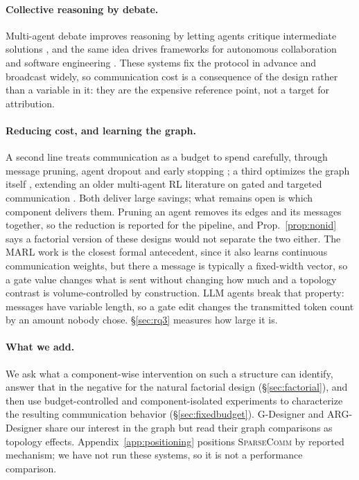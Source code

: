 \documentclass[11pt]{article}
\newcommand{\sys}{\textsc{SparseComm}\xspace}
\begin{document}
\paragraph{Collective reasoning by debate.}
Multi-agent debate improves reasoning by letting agents critique intermediate
solutions
\citep{du2024improving,liang-etal-2024-encouraging,chan2023chatevalbetterllmbasedevaluators},
and the same idea drives frameworks for autonomous collaboration and software
engineering
\citep{wu2024autogen,li2023camel,hong2024metagpt,qian-etal-2024-chatdev,chen2023agentverse,gao2024agentscopeflexiblerobustmultiagent}.
These systems fix the protocol in advance and broadcast widely, so communication
cost is a consequence of the design rather than a variable in it: they are the
expensive reference point, not a target for attribution.

\paragraph{Reducing cost, and learning the graph.}
A second line treats communication as a budget to spend carefully, through
message pruning, agent dropout and early stopping
\citep{zhang2025cut,wang-etal-2025-agentdropout}; a third optimizes the graph
itself
\citep{zhang2025gdesigner,li2026assemble,zhuge2024gptswarm,shen-etal-2025-understanding},
extending an older multi-agent RL literature on gated and targeted communication
\citep{sukhbaatar2016learningmultiagentcommunicationbackpropagation,foerster2016learning,das2019tarmac,singh2018individualized,jiang2018learningattentionalcommunicationmultiagent}.
Both deliver large savings; what remains open is which component delivers them.
Pruning an agent removes its edges and its messages together, so the reduction is
reported for the pipeline, and Prop.~\ref{prop:nonid} says a factorial version of
these designs would not separate the two either. The MARL work is the closest formal antecedent,
since it also learns continuous communication weights, but there a message is
typically a fixed-width vector, so a gate value changes what is sent without
changing how much and a topology contrast is volume-controlled by construction.
LLM agents break that property: messages have variable length, so a gate edit
changes the transmitted token count by an amount nobody chose.
\S\ref{sec:rq3} measures how large it is.

\paragraph{What we add.}
We ask what a component-wise intervention on such a structure can identify,
answer that in the negative for the natural factorial design
(\S\ref{sec:factorial}), and then use budget-controlled and component-isolated
experiments to characterize the resulting communication behavior
(\S\ref{sec:fixedbudget}). G-Designer \citep{zhang2025gdesigner} and
ARG-Designer \citep{li2026assemble} share our interest in the graph but read
their graph comparisons as topology effects.
Appendix~\ref{app:positioning} positions \sys by reported mechanism; we have not
run these systems, so it is not a performance comparison.
\end{document}

